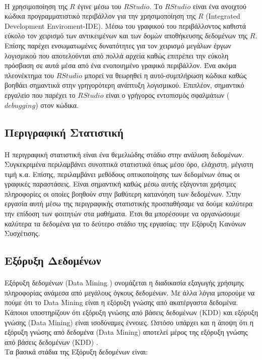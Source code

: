 \documentclass[12pt,a4paper,final]{article}
\begin{document}
\paragraph{}
Η χρησιμοποίηση της $R$ έγινε μέσω του $RStudio$\foreignlanguage{english}{\cite{Rstudio}}. Το $RStudio$ είναι ένα ανοιχτού κώδικα προγραμματιστικό περιβάλλον για την χρησιμοποίηση της $R$ (\foreignlanguage{english}{Integrated Development Enviroment-IDE}). Μέσω του γραφικού του περιβάλλοντος καθιστά εύκολο τον χειρισμό των αντικειμένων και των δομών αποθήκευσης δεδομένων της $R$. Επίσης παρέχει ενσωματωμένες δυνατότητες για τον χειρισμό μεγάλων έργων λογισμικού που αποτελούνται από πολλά αρχεία καθώς επιτρέπει την εύκολη πρόσβαση σε αυτά  μέσα από ένα ενοποιημένο γραφικό περιβάλλον. Ένα ακόμα πλεονέκτημα του $RStudio$ μπορεί να θεωρηθεί η αυτό-συμπλήρωση  κώδικα καθώς βοηθάει σημαντικά στην γρηγορότερη ανάπτυξη  λογισμικού. Επιπλέον, σημαντικό εργαλείο που παρέχει το $RStudio$ είναι ο γρήγορος εντοπισμός σφαλμάτων ($debugging$) στον κώδικα.
  


\clearpage
\subsection{Περιγραφική Στατιστική}
\paragraph{}
Η περιγραφική στατιστική\foreignlanguage{english}{\cite{descriptiveStats}} είναι ένα θεμελιώδης στάδιο στην ανάλυση δεδομένων. Συγκεκριμένα περιλαμβάνει συνοπτικά στατιστικά όπως μέσο όρο, ελάχιστη, μέγιστη τιμή κ.α. Επίσης, περιλαμβάνει μεθόδους οπτικοποίησης των δεδομένων όπως οι γραφικές παραστάσεις. Είναι σημαντική καθώς μέσω αυτής εξάγονται χρήσιμες πληροφορίες οι οποίες βοηθούν  στην βαθύτερη κατανόηση των δεδομένων. Στην εργασία αυτή μέσω της περιγραφικής στατιστικής προσπαθήσαμε να δούμε καλύτερα την επίδοση των φοιτητών στα μαθήματα. Έτσι θα μπορέσουμε να οργανώσουμε καλύτερα τα δεδομένα για το δεύτερο στάδιο της εργασίας: την Εξόρυξη Κανόνων Συσχέτισης.

\subsection{Εξόρυξη Δεδομένων}
\paragraph{}
Εξόρυξη δεδομένων (\foreignlanguage{english}{Data Mining \cite{datamining}}) ονομάζεται η διαδικασία εξαγωγής χρήσιμης πληροφορίας  ανάμεσα από μεγάλους όγκους δεδομένων. Με άλλα λόγια μπορούμε να πούμε ότι το \foreignlanguage{english}{Data Mining} είναι η εξόρυξη γνώσης από ακατέργαστα δεδομένα. Κάποιοι υποστηρίζουν ότι εξόρυξη γνώσης από βάσεις δεδομένων (\foreignlanguage{english}{KDD) \cite{OugKDD8}} και εξόρυξη γνώσης (\foreignlanguage{english}{Data Mining}) είναι ισοδύναμες έννοιες. Ωστόσο υπάρχει και η άποψη ότι η εξόρυξη γνώσης από δεδομένα (\foreignlanguage{english}{Data Mining}) αποτελεί μέρος της εξόρυξη γνώσης από βάσεις δεδομένων (\foreignlanguage{english}{KDD) \cite{FayyadKDD}}.\\
Τα βασικά στάδια της Εξόρυξη δεδομένων είναι: 
\end{document}
